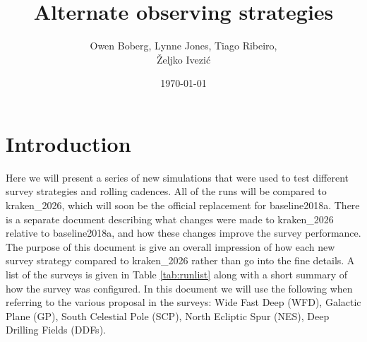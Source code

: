 \documentclass[DM,lsstdraft,authoryear,toc]{lsstdoc}
\title{Alternate observing strategies}
\author{%
Owen Boberg,
Lynne Jones,
Tiago Ribeiro, \\
\v{Z}eljko Ivezi\'{c}}
\date{\today}
\begin{document}
\maketitle

\section{Introduction}

Here we will present a series of new simulations that were used to test different survey strategies and rolling cadences.
All of the runs will be compared to kraken\_2026, which will soon be the official replacement for baseline2018a. There is
a separate document describing what changes were made to kraken\_2026 relative to baseline2018a, and how these changes
improve the survey performance. The purpose of this document is give an overall impression of how each new survey strategy 
compared to kraken\_2026 rather than go into the fine details. A list of the surveys is given in Table \ref{tab:runlist} along with
a short summary of how the survey was configured. In this document we will use the following when referring to the various
proposal in the surveys: Wide Fast Deep (WFD), Galactic Plane (GP), South Celestial Pole (SCP), North Ecliptic Spur (NES),
Deep Drilling Fields (DDFs).
\end{document}
